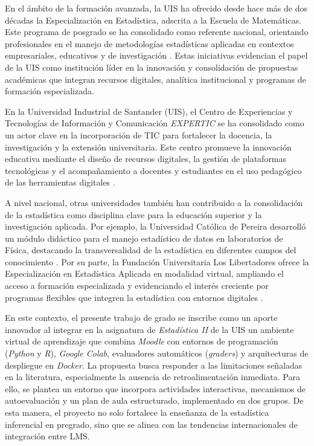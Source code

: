 \documentclass[letter,oneside,12pt,spanish]{report}
\begin{document}
En el ámbito de la formación avanzada, la UIS ha ofrecido desde hace más de dos décadas la 
Especialización en Estadística, adscrita a la Escuela de Matemáticas. Este programa de posgrado 
se ha consolidado como referente nacional, orientando profesionales en el manejo de metodologías 
estadísticas aplicadas en contextos empresariales, educativos y de investigación 
\parencite{especializacionstatssf}. Estas iniciativas evidencian el papel de la UIS como 
institución líder en la innovación y consolidación de propuestas académicas que integran 
recursos digitales, analítica institucional y programas de formación especializada.

En la Universidad Industrial de Santander (UIS), el Centro de Experiencias y 
Tecnologías de Información y Comunicación \textit{EXPERTIC} se ha consolidado como un actor clave 
en la incorporación de TIC para fortalecer la docencia, la investigación y la extensión universitaria. 
Este centro promueve la innovación educativa mediante el diseño de recursos digitales, la gestión de 
plataformas tecnológicas y el acompañamiento a docentes y estudiantes en el uso pedagógico de las 
herramientas digitales \parencite{UIS2025a}. 

A nivel nacional, otras universidades también han contribuido a la consolidación de la estadística
 como disciplina clave para la educación superior y la investigación aplicada. Por ejemplo, la 
 Universidad Católica de Pereira desarrolló un módulo didáctico para el manejo estadístico de 
 datos en laboratorios de Física, destacando la transversalidad de la estadística en diferentes 
 campos del conocimiento \parencite{ucp2018}. Por su parte, la Fundación Universitaria Los 
 Libertadores ofrece la Especialización en Estadística Aplicada en modalidad virtual, ampliando 
 el acceso a formación especializada y evidenciando el interés creciente por programas flexibles 
 que integren la estadística con entornos digitales \parencite{libertadoressf}.

En este contexto, el presente trabajo de grado se inscribe como un aporte innovador al 
integrar en la asignatura de \textit{Estadística II} de la UIS un ambiente virtual de aprendizaje 
que combina \textit{Moodle} con entornos de programación (\textit{Python} y \textit{R}), 
\textit{Google Colab}, evaluadores automáticos (\textit{graders}) y arquitecturas de despliegue en 
\textit{Docker}. La propuesta busca responder a las limitaciones señaladas en la literatura, 
especialmente la ausencia de retroalimentación inmediata. Para ello, se plantea un entorno que 
incorpora actividades interactivas, mecanismos de autoevaluación y un plan de aula estructurado, 
implementado en dos grupos. De esta manera, el proyecto no solo fortalece la enseñanza de la 
estadística inferencial en pregrado, sino que se alinea con las tendencias internacionales de 
integración entre LMS.
\end{document}
